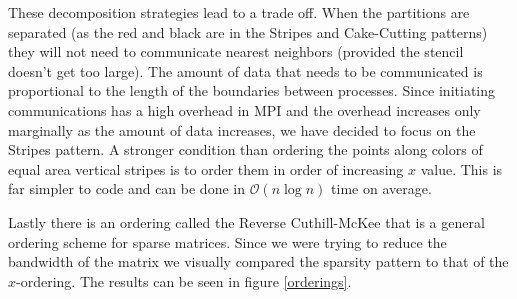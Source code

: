 \documentclass[12pt]{article}
\begin{document}
These decomposition strategies lead to a trade off. When the partitions are separated (as the red and black are in the Stripes and Cake-Cutting patterns) they will not need to communicate nearest neighbors (provided the stencil doesn't get too large). The amount of data that needs to be communicated is  proportional to the length of the boundaries between processes. Since initiating communications has a high overhead in MPI and the overhead increases only marginally as the amount of data increases, we have decided to focus on the Stripes pattern. A stronger condition than ordering the points along colors of equal area vertical stripes is to order them in order of increasing $x$ value. This is far simpler to code and can be done in $\mathcal{O}(n\log n)$ time on average. 

Lastly there is an ordering called the Reverse Cuthill-McKee that is a general ordering scheme for sparse matrices. Since we were trying to reduce the bandwidth of the matrix we visually compared the sparsity pattern to that of the $x$-ordering. The results can be seen in figure \ref{orderings}.
\end{document}
